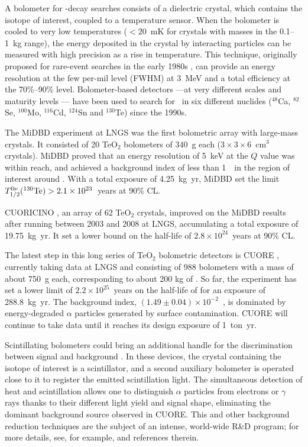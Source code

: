 %
A bolometer for \bbonu-decay searches consists of a dielectric crystal, which contains the isotope of interest, coupled to a temperature sensor. When the bolometer is cooled to very low temperatures ($<20$~mK for crystals with masses in the 0.1--1~kg range), the energy deposited in the crystal by interacting particles can be measured with high precision as a rise in temperature. This technique, originally proposed for rare-event searches in the early 1980s \cite{Fiorini:1983yj}, can provide an energy resolution at the few per-mil level (FWHM) at 3~MeV and a total efficiency at the 70\%--90\% level. Bolometer-based detectors ---\thinspace at very different scales and maturity levels \thinspace--- have been used to search for \bbonu\ in six different nuclides ($^{48}$Ca, $^{82}$Se, $^{100}$Mo, $^{116}$Cd, $^{124}$Sn and $^{130}$Te) since the 1990s.

The MiDBD experiment \cite{Arnaboldi:2002te} at LNGS was the first bolometric array with large-mass crystals. It consisted of 20 TeO$_2$ bolometers of 340~g each ($3\times3\times6$~cm$^3$ crystals). MiDBD proved that an energy resolution of 5~keV at the $Q$ value was within reach, and achieved a background index of less than 1~\ckky\ in the region of interest around \Qbb. With a total exposure of 4.25~kg~yr, MiDBD set the limit $T_{1/2}^{0\nu}(^{130}\mathrm{Te}) > 2.1\times10^{23}$~years at 90\% CL. 

CUORICINO \cite{Andreotti:2010vj}, an array of 62 TeO$_2$ crystals, improved on the MiDBD results after running between 2003 and 2008 at LNGS, accumulating a total exposure of 19.75~kg~yr. It set a lower bound on the  half-life of $2.8\times10^{24}$~years at 90\% CL. 

The latest step in this long series of TeO$_2$ bolometric detectors is CUORE \cite{CUORE:2021mvw}, currently taking data at LNGS and consisting of 988 bolometers with a mass of about 750~g each, corresponding to about 200 kg of . So far, the experiment has set a lower limit of $2.2\times10^{25}$~years on the half-life of  for an exposure of 288.8~kg~yr. The background index, $(1.49\pm0.04)\times 10^{-2}$~\ckky, is dominated by energy-degraded $\alpha$ particles generated by surface contamination. CUORE will continue to take data until it reaches its design  exposure of 1~ton~yr. 

Scintillating bolometers could bring an additional handle for the discrimination between signal and background \cite{Pirro:2005ar}. In these devices, the crystal containing the isotope of interest is a scintillator, and a second auxiliary bolometer is operated close to it to register the emitted scintillation light. The simultaneous detection of heat and scintillation allows one to distinguish $\alpha$ particles from electrons or $\gamma$ rays thanks to their different light yield and signal shape, eliminating the dominant background source observed in CUORE. This and other background reduction techniques are the subject of an intense, world-wide R\&D program; for more details, see, for example, \cite{Zolotarova:2021inw} and references therein.

